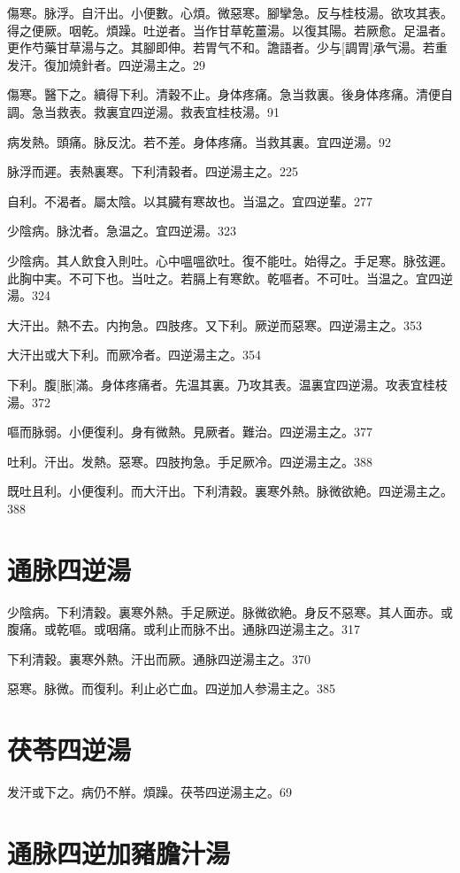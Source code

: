 \documentclass[12pt,oneside,UTF8,b5paper]{ctexbook}她她她她她她她
\begin{document}
傷寒。脉浮。自汗出。小便數。心煩。微惡寒。腳攣急。反与桂枝湯。欲攻其表。得之便厥。咽乾。煩躁。吐逆者。当作甘草乾薑湯。以復其陽。若厥愈。足温者。更作芍藥甘草湯与之。其腳即伸。若胃气不和。譫語者。少与[調胃]承气湯。若重发汗。復加燒針者。四逆湯主之。29

傷寒。醫下之。續得下利。清穀不止。身体疼痛。急当救裏。後身体疼痛。清便自調。急当救表。救裏宜四逆湯。救表宜桂枝湯。91

病发熱。頭痛。脉反沈。若不差。身体疼痛。当救其裏。宜四逆湯。92

脉浮而遲。表熱裏寒。下利清穀者。四逆湯主之。225

自利。不渴者。屬太陰。以其臓有寒故也。当温之。宜四逆輩。277

少陰病。脉沈者。急温之。宜四逆湯。323

少陰病。其人飲食入則吐。心中嗢嗢欲吐。復不能吐。始得之。手足寒。脉弦遲。此胸中実。不可下也。当吐之。若膈上有寒飲。乾嘔者。不可吐。当温之。宜四逆湯。324

大汗出。熱不去。内拘急。四肢疼。又下利。厥逆而惡寒。四逆湯主之。353

大汗出或大下利。而厥冷者。四逆湯主之。354

下利。腹[胀]滿。身体疼痛者。先温其裏。乃攻其表。温裏宜四逆湯。攻表宜桂枝湯。372

嘔而脉弱。小便復利。身有微熱。見厥者。難治。四逆湯主之。377

吐利。汗出。发熱。惡寒。四肢拘急。手足厥冷。四逆湯主之。388

既吐且利。小便復利。而大汗出。下利清穀。裏寒外熱。脉微欲絶。四逆湯主之。388

\section{通脉四逆湯}

少陰病。下利清穀。裏寒外熱。手足厥逆。脉微欲絶。身反不惡寒。其人面赤。或腹痛。或乾嘔。或咽痛。或利止而脉不出。通脉四逆湯主之。317

下利清穀。裏寒外熱。汗出而厥。通脉四逆湯主之。370

惡寒。脉微。而復利。利止必亡血。四逆加人参湯主之。385

\section{茯苓四逆湯}

发汗或下之。病仍不觧。煩躁。茯苓四逆湯主之。69

\section{通脉四逆加豬膽汁湯}
\end{document}
